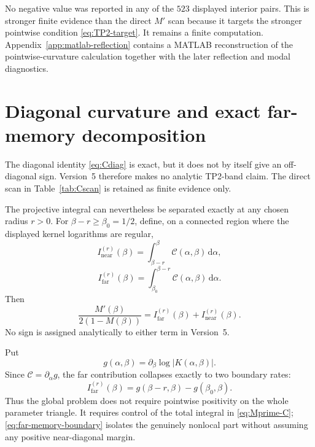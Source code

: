 \documentclass[11pt]{amsart}
\numberwithin{equation}{section}
\theoremstyle{plain}
\theoremstyle{definition}
\theoremstyle{remark}
\newcommand{\Ccal}{\mathcal C}
\newcommand{\dd}{\,\mathrm d}
\begin{document}
No negative value was reported in any of the $523$ displayed interior pairs.  This is stronger finite evidence than the direct $M'$ scan because it targets the stronger pointwise condition \eqref{eq:TP2-target}.  It remains a finite computation.  Appendix~\ref{app:matlab-reflection} contains a MATLAB reconstruction of the pointwise-curvature calculation together with the later reflection and modal diagnostics.

\section{Diagonal curvature and exact far-memory decomposition}
\label{sec:far-memory}

The diagonal identity \eqref{eq:Cdiag} is exact, but it does not by itself give an off-diagonal sign.  Version~5 therefore makes no analytic TP2-band claim.  The direct scan in Table~\ref{tab:Cscan} is retained as finite evidence only.

The projective integral can nevertheless be separated exactly at any chosen radius $r>0$.  For $\beta-r\ge\beta_0=1/2$, define, on a connected region where the displayed kernel logarithms are regular,
\begin{equation}
I_{\mathrm{near}}^{(r)}(\beta)
=\int_{\beta-r}^{\beta}\Ccal(\alpha,\beta)\dd\alpha,
\label{eq:Inear}
\end{equation}
\begin{equation}
I_{\mathrm{far}}^{(r)}(\beta)
=\int_{\beta_0}^{\beta-r}\Ccal(\alpha,\beta)\dd\alpha.
\label{eq:Ifar}
\end{equation}
Then
\begin{equation}
\boxed{
\frac{M'(\beta)}{2(1-M(\beta))}
=I_{\mathrm{far}}^{(r)}(\beta)+I_{\mathrm{near}}^{(r)}(\beta).
}
\label{eq:Ifar-Inear}
\end{equation}
No sign is assigned analytically to either term in Version~5.

Put
\begin{equation}
g(\alpha,\beta)=\partial_\beta\log|K(\alpha,\beta)|.
\label{eq:g-kernel}
\end{equation}
Since $\Ccal=\partial_\alpha g$, the far contribution collapses exactly to two boundary rates:
\begin{equation}
\boxed{
I_{\mathrm{far}}^{(r)}(\beta)
=g(\beta-r,\beta)-g(\beta_0,\beta).
}
\label{eq:far-memory-boundary}
\end{equation}
Thus the global problem does not require pointwise positivity on the whole parameter triangle.  It requires control of the total integral in \eqref{eq:Mprime-C}; \eqref{eq:far-memory-boundary} isolates the genuinely nonlocal part without assuming any positive near-diagonal margin.
\end{document}
